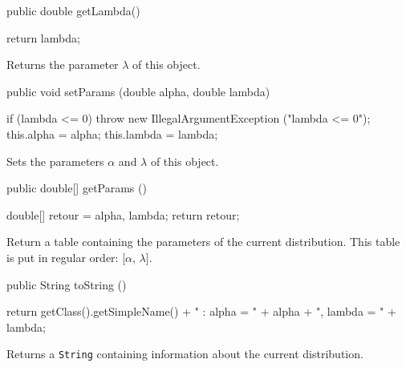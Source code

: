 \begin{code}

   public double getLambda()\begin{hide} {
      return lambda;
   }\end{hide}
\end{code}
  \begin{tabb} Returns the parameter $\lambda$ of this object.
  \end{tabb}
\begin{code}

   public void setParams (double alpha, double lambda)\begin{hide} {
      if (lambda <= 0)
         throw new IllegalArgumentException ("lambda <= 0");
      this.alpha  = alpha;
      this.lambda = lambda;
   }\end{hide}
\end{code}
  \begin{tabb} Sets the parameters $\alpha$ and $\lambda$ of this object.
  \end{tabb}
\begin{code}

   public double[] getParams ()\begin{hide} {
      double[] retour = {alpha, lambda};
      return retour;
   }\end{hide}
\end{code}
\begin{tabb}
   Return a table containing the parameters of the current distribution.
   This table is put in regular order: [$\alpha$, $\lambda$].
\end{tabb}
\begin{hide}\begin{code}

   public String toString ()\begin{hide} {
      return getClass().getSimpleName() + " : alpha = " + alpha + ", lambda = " + lambda;
   }\end{hide}
\end{code}
\begin{tabb}
   Returns a \texttt{String} containing information about the current distribution.
\end{tabb}\end{hide}
\begin{code}\begin{hide}
}\end{hide}
\end{code}
